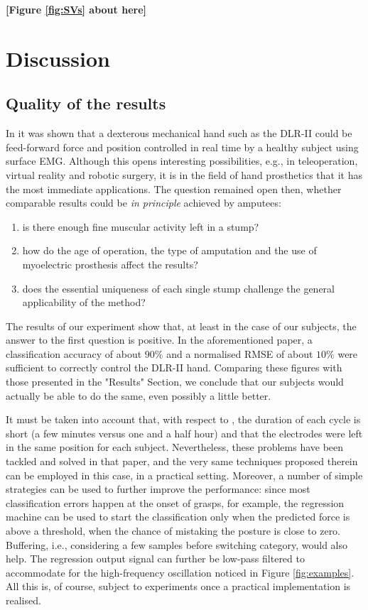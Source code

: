 \documentclass[review,authoryear]{elsarticle}
\renewcommand{\cite}{\citep}
\begin{document}
\noindent \textbf{[Figure \ref{fig:SVs} about here]}

\section{Discussion}
\label{sec:disc}

\subsection{Quality of the results}

In \cite{2008.BioCyb} it was shown that a dexterous mechanical hand such as
the DLR-II could be feed-forward force and position controlled in
real time by a healthy subject using surface EMG. Although this opens
interesting possibilities, e.g., in teleoperation, virtual reality
and robotic surgery, it is in the field of hand prosthetics that it has the
most immediate applications. The question remained open then, whether comparable
results could be \emph{in principle} achieved by amputees:

\begin{enumerate}

  \item is there enough fine muscular activity left in a stump?
  \item how do the age of operation, the type of
	amputation and the use of myoelectric prosthesis affect the results?
  \item does the essential uniqueness of each single stump challenge the
  	general applicability of the method?

\end{enumerate}

The results of our experiment show that, at least in the case of our subjects, the
answer to the first question is positive. In the aforementioned paper, a classification
accuracy of about $90\%$ and a normalised RMSE of about $10\%$ were sufficient to
correctly control the DLR-II hand. Comparing these figures with those presented in the
"Results" Section, we conclude that our subjects would actually be able to
do the same, even possibly a little better. 

It must be taken into account that, with respect to \cite{2008.BioCyb},
the duration of each cycle is short (a few minutes versus one and a half hour)
and that the electrodes were left in the same position for each subject. Nevertheless,
these problems have been tackled and solved in that paper, and the very same
techniques proposed therein can be employed in this case, in a practical setting.
Moreover, a number of simple strategies can be used to further improve the
performance: since most classification errors happen at the onset
of grasps, for example, the regression machine can be used to start the classification only
when the predicted force is above a threshold, when the chance of mistaking the
posture is close to zero. Buffering, i.e., considering a few samples before
switching category, would also help. The regression output
signal can further be low-pass filtered to accommodate for the high-frequency oscillation
noticed in Figure \ref{fig:examples}. All this is, of course, subject to experiments
once a practical implementation is realised.
\end{document}
